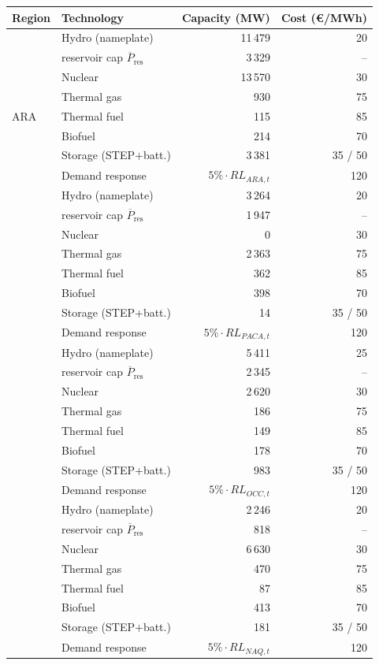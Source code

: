\documentclass[12pt]{article}
\begin{document}
\begin{table}[H]
\centering
\setlength{\tabcolsep}{6pt}
\renewcommand{\arraystretch}{1}
\begin{tabularx}{\linewidth}{l X r r}
\toprule
\textbf{Region} & \textbf{Technology} & \textbf{Capacity (MW)} & \textbf{Cost (€/MWh)} \\
\midrule
\multirow{9}{*}{ARA}
& Hydro (nameplate)  & 11\,479  & 20  \\
& \quad reservoir cap $\overline{P}_{\text{res}}$ & 3\,329 & --  \\
& Nuclear            & 13\,570  & 30  \\
& Thermal gas        &   930    & 75  \\
& Thermal fuel       &   115    & 85  \\
& Biofuel            &   214    & 70  \\
& Storage (STEP+batt.)    & 3\,381   & 35 / 50  \\
& Demand response    & $5\% \cdot RL_{ARA,t}$ & 120  \\
\addlinespace
\multirow{9}{*}{PACA}
& Hydro (nameplate)  & 3\,264  & 20  \\
& \quad reservoir cap $\overline{P}_{\text{res}}$ & 1\,947 & --  \\
& Nuclear            & 0  & 30  \\
& Thermal gas        & 2\,363   & 75  \\
& Thermal fuel       &   362   & 85  \\
& Biofuel            &   398   & 70  \\
& Storage (STEP+batt.)    & 14     & 35 / 50  \\
& Demand response    & $5\% \cdot RL_{PACA,t}$ & 120 \\
\addlinespace
\multirow{9}{*}{OCC}
& Hydro (nameplate)  & 5\,411  & 25  \\
& \quad reservoir cap $\overline{P}_{\text{res}}$ & 2\,345 & --  \\
& Nuclear            & 2\,620  & 30  \\
& Thermal gas        &   186   & 75  \\
& Thermal fuel       &   149   & 85  \\
& Biofuel            &   178   & 70  \\
& Storage (STEP+batt.)    & 983  & 35 / 50  \\
& Demand response    & $5\% \cdot RL_{OCC,t}$ & 120 \\
\addlinespace
\multirow{9}{*}{NAQ}
& Hydro (nameplate)  & 2\,246  & 20  \\
& \quad reservoir cap $\overline{P}_{\text{res}}$ & 818 & --  \\
& Nuclear            & 6\,630  & 30  \\
& Thermal gas        &   470   & 75  \\
& Thermal fuel       &    87   & 85  \\
& Biofuel            &   413   & 70  \\
& Storage (STEP+batt.)    & 181     & 35 / 50  \\
& Demand response    & $5\% \cdot RL_{NAQ,t}$ & 120  \\
\bottomrule
\end{tabularx}


\end{table}
\end{document}
